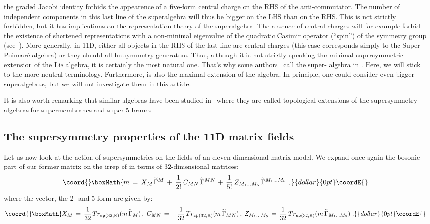 \documentclass[a4paper,11pt]{article}
\begin{document}
the graded Jacobi identity forbids the appearence of a five-form central charge on the RHS of 
the \coordHE{} anti-commutator. The number of independent components in this last line of the 
superalgebra will thus be bigger on the LHS than on the RHS. This is not strictly forbidden, but 
it has implications on the representation theory of the superalgebra. The absence of central 
charges will for example forbid the existence of shortened representations with a non-minimal
eigenvalue of the quadratic Casimir operator \coordHE{} (``spin'') of the 
\coordHE{} symmetry group (see~\cite{Nic}). 
More generally, in 11D, either all objects in the RHS of the last line are central charges 
(this case corresponds simply to the \coordHE{} Super-Poincar\'e algebra) or they should all be 
symmetry generators.
Thus, although it is not strictly-speaking the minimal supersymmetric extension of the 
\coordHE{} Lie algebra, it is certainly the most natural one. That's why some authors~\cite{BVP} 
call \coordHE{} the super-\coordHE{} algebra in \coordHE{}. Here, we will 
stick to the more neutral \coordHE{} terminology. 
Furthermore, \coordHE{} is also the maximal \coordHE{} extension of the \coordHE{}
algebra. In principle, one could consider even bigger superalgebras, but we will not investigate
them in this article.

It is also worth remarking that similar algebras have been studied in~\cite{Sez} where they are called
topological extensions of the supersymmetry algebras for supermembranes and super-5-branes. 

\subsection{The supersymmetry properties of the 11D matrix fields}
Let us now look at the action of supersymmetries on the fields of an 
\coordHE{} eleven-dimensional matrix model.
We expand once again the bosonic part of our former matrix
\coordHE{} on the irrep of \coordHE{} in terms of 32-dimensional \myHighlight{$\Gamma$}\coordHE{} matrices:
$$\coord{}\boxMath{
m\,=\,
X_M\,\widetilde{\Gamma}^M\,+\,\frac{1}{2!}\,C_{MN}\,\widetilde{\Gamma}^{MN}
\,+\,\frac{1}{5!}\,Z_{M_1\ldots M_5}\,\widetilde{\Gamma}^{M_1\ldots M_5}\;,
}{dollar}{0pt}\coordE{}$$ 
where the vector, the 2- and 5-form are given by:
$$\coord{}\boxMath{
X_M\,=\, \frac{1}{32}\,Tr_{\mathfrak{sp}(32,\mathbb{R})}(m\,\widetilde{\Gamma}_{M})\,, \;
C_{MN}\,=\, -\frac{1}{32}\,Tr_{\mathfrak{sp}(32,\mathbb{R})}(m\,\widetilde{\Gamma}_{MN})\,, \;
Z_{M_1\ldots M_5}\,=\, \frac{1}{32}\,Tr_{\mathfrak{sp}(32,\mathbb{R})}
(m\,\widetilde{\Gamma}_{M_1\ldots M_5})\;.
}{dollar}{0pt}\coordE{}$$
\end{document}
